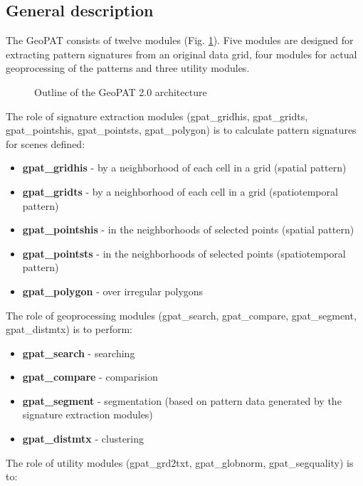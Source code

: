 \subsection{General description}

The GeoPAT consists of twelve modules (Fig. \ref{FIG:GPAT}).
Five modules are designed for extracting pattern signatures from an original data grid, four modules for actual geoprocessing of the patterns and three utility modules.

\begin{figure}[H]
	\caption{Outline of the GeoPAT 2.0 architecture}
	\label{FIG:GPAT} 
\end{figure}

The role of signature extraction modules (gpat\_gridhis, gpat\_gridts, gpat\_pointshis, gpat\_pointsts, gpat\_polygon) is to calculate pattern signatures for scenes defined:

\begin{itemize}
  \item \textbf{gpat\_gridhis} - by a neighborhood of each cell in a grid (spatial pattern)
  \item \textbf{gpat\_gridts} - by a neighborhood of each cell in a grid (spatiotemporal pattern)
  \item \textbf{gpat\_pointshis} - in the neighborhoods of selected points (spatial pattern)
  \item \textbf{gpat\_pointsts} - in the neighborhoods of selected points (spatiotemporal pattern)
  \item \textbf{gpat\_polygon} - over irregular polygons
\end{itemize}

The role of geoprocessing modules (gpat\_search, gpat\_compare, gpat\_segment, gpat\_distmtx) is to perform:

\begin{itemize}
  \item \textbf{gpat\_search} - searching
  \item \textbf{gpat\_compare} - comparision
  \item \textbf{gpat\_segment} - segmentation (based on pattern data generated by the signature extraction modules)
  \item \textbf{gpat\_distmtx} - clustering
\end{itemize}

The role of utility modules (gpat\_grd2txt, gpat\_globnorm, gpat\_segquality) is to:

